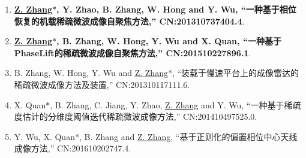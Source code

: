 \documentclass[paper=a4,fontsize=11pt]{scrartcl}
\begin{document}
\begin{enumerate}
	
	\item \textbf{\underline{Z. Zhang$\ast$}, Y. Zhao, B. Zhang, W. Hong and Y. Wu, ``一种基于相位恢复的机载稀疏微波成像自聚焦方法,'' CN:201310737404.4}.
	
	\item \textbf{\underline{Z. Zhang$\ast$}, B. Zhang, W. Hong, Y. Wu and X. Quan, ``一种基于PhaseLift的稀疏微波成像自聚焦方法,'' CN:201510227896.1}.
	
	\item B. Zhang, W. Hong, Y. Wu and \underline{Z. Zhang$\ast$}, ``装载于慢速平台上的成像雷达的稀疏微波成像方法及装置,'' CN:201310117111.6.
	
	\item X. Quan$\ast$, B. Zhang, C. Jiang, Y. Zhao, \underline{Z. Zhang} and Y. Wu, ``一种基于稀疏度估计的分维度阈值迭代稀疏微波成像方法,'' CN:201410497525.0.
	
	\item Y. Wu, X. Quan$\ast$, B. Zhang and \underline{Z. Zhang}, ``基于正则化的偏置相位中心天线成像方法,'' CN:201610202747.4.
	
\end{enumerate}
\end{document}
